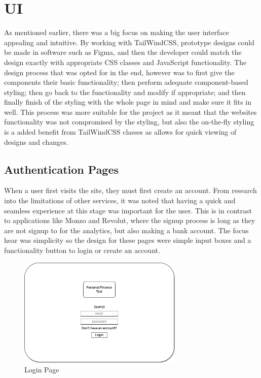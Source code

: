 \section{UI}
As mentioned earlier, there was a big focus on making the user interface appealing and intuitive. By working with TailWindCSS, prototype designs could be made in software such as Figma, and then the developer could match the design exactly with appropriate CSS classes and JavaScript functionality. The design process that was opted for in the end, however was to first give the components their basic functionality; then perform adequate component-based styling; then go back to the functionality and modify if appropriate; and then finally finish of the styling with the whole page in mind and make sure it fits in well. This process was more suitable for the project as it meant that the websites functionality was not compromised by the styling, but also the on-the-fly styling is a added benefit from TailWindCSS classes as allows for quick viewing of designs and changes.

\subsection{Authentication Pages}
When a user first visits the site, they must first create an account. From research into the limitations of other services, it was noted that having a quick and seamless experience at this stage was important for the user. This is in contrast to applications like Monzo and Revolut, where the signup process is long as they are not signup to for the analytics, but also making a bank account. The focus hear was simplicity so the design for these pages were simple input boxes and a functionality button to login or create an account. 

\begin{figure}[h!]
	\centering
	\includegraphics[width=0.7\textwidth]{images/Login_specification.png}
	\caption{Login Page}
	\label{fig:LoginPage}
\end{figure}


